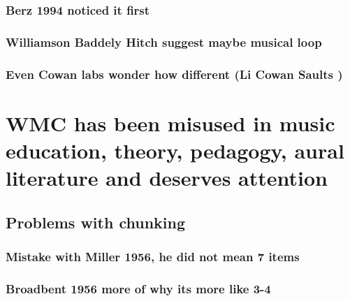 \documentclass[]{book}
\theoremstyle{definition}
\theoremstyle{definition}
\theoremstyle{definition}
\theoremstyle{remark}
\begin{document}
\hypertarget{berz-1994-noticed-it-first}{%
\subsubsection{Berz 1994 noticed it
first}\label{berz-1994-noticed-it-first}}

\hypertarget{williamson-baddely-hitch-suggest-maybe-musical-loop}{%
\subsubsection{Williamson Baddely Hitch suggest maybe musical
loop}\label{williamson-baddely-hitch-suggest-maybe-musical-loop}}

\hypertarget{even-cowan-labs-wonder-how-different-li-cowan-saults}{%
\subsubsection{Even Cowan labs wonder how different (Li Cowan Saults
)}\label{even-cowan-labs-wonder-how-different-li-cowan-saults}}

\hypertarget{wmc-has-been-misused-in-music-education-theory-pedagogy-aural-literature-and-deserves-attention}{%
\section{WMC has been misused in music education, theory, pedagogy,
aural literature and deserves
attention}\label{wmc-has-been-misused-in-music-education-theory-pedagogy-aural-literature-and-deserves-attention}}

\hypertarget{problems-with-chunking}{%
\subsection{Problems with chunking}\label{problems-with-chunking}}

\hypertarget{mistake-with-miller-1956-he-did-not-mean-7-items}{%
\subsubsection{Mistake with Miller 1956, he did not mean 7
items}\label{mistake-with-miller-1956-he-did-not-mean-7-items}}

\hypertarget{broadbent-1956-more-of-why-its-more-like-3-4}{%
\subsubsection{Broadbent 1956 more of why its more like
3-4}\label{broadbent-1956-more-of-why-its-more-like-3-4}}
\end{document}
